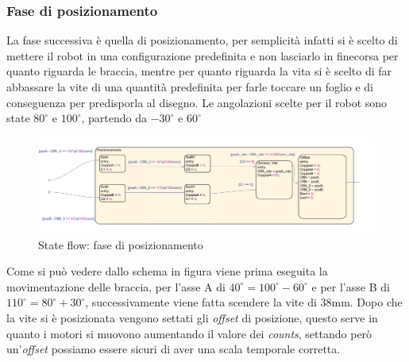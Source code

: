 \subsubsection{Fase di posizionamento}
La fase successiva è quella di posizionamento, per semplicità infatti si è scelto di mettere il robot in una configurazione predefinita e non lasciarlo in finecorsa per quanto riguarda le braccia, mentre per quanto riguarda la vita si è scelto di far abbassare la vite di una quantità predefinita per farle toccare un foglio e di conseguenza per predisporla al disegno. Le angolazioni scelte per il robot sono state $80^\circ$ e $100^\circ$, partendo da $-30^\circ$ e $60^\circ$
\begin{figure}[ht]
\begin{center}
    \includegraphics[scale=0.31]{Immagini/Sperimentale/state2.png}
    \caption{State flow: fase di posizionamento}
\end{center}
\end{figure}
Come si può vedere dallo schema in figura viene prima eseguita la movimentazione delle braccia, per l'asse A di $40^\circ = 100^\circ - 60^\circ$ e per l'asse B di $110^\circ = 80^\circ + 30^\circ$, successivamente viene fatta scendere la vite di 38mm. Dopo che la vite si è posizionata vengono settati gli \textit{offset} di posizione, questo serve in quanto i motori si muovono aumentando il valore dei \textit{counts}, settando però un'\textit{offset} possiamo essere sicuri di aver una scala temporale corretta.
